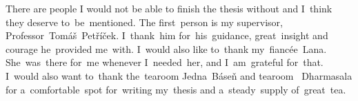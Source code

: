 \large
There are people I would not be able to finish the thesis without and I~think they deserve to~be~mentioned.
The first~person is my supervisor, Professor~Tomáš~Petříček.
I~thank~him for~his~guidance, great~insight and courage he~provided me~with.
I~would also like to~thank my~fiancée~Lana.
She~was~there for~me whenever I~needed~her, and I~am~grateful for~that.
I~would also want to~thank the~tearoom Jedna~Báseň and tearoom~ Dharmasala
for a~comfortable~spot for~writing my~thesis and a~steady~supply of~great~tea.
